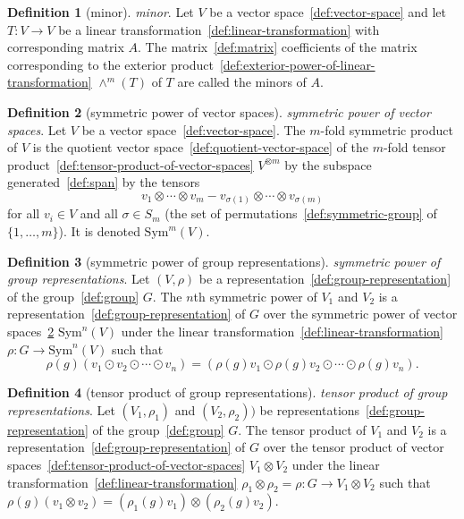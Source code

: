 \documentclass[12pt,a4paper]{article}
\theoremstyle{definition}
\newtheorem{definition}{Definition}
\begin{document}
\begin{definition}[minor]\label{def:minor}
\emph{minor}. Let $V$ be a vector space~\ref{def:vector-space} and let $T: V\to V$ be a linear transformation~\ref{def:linear-transformation} with corresponding matrix $A$. The matrix~\ref{def:matrix} coefficients of the matrix corresponding to the exterior product~\ref{def:exterior-power-of-linear-transformation} $\wedge^m(T)$ of $T$ are called the minors of $A$.
\end{definition}

\begin{definition}[symmetric power of vector spaces]\label{def:symmetric-power-of-vector-spaces}
\emph{symmetric power of vector spaces}. Let $V$ be a vector space~\ref{def:vector-space}. The $m$-fold symmetric product of $V$ is the quotient vector space~\ref{def:quotient-vector-space} of the $m$-fold tensor product~\ref{def:tensor-product-of-vector-spaces} $V^{\otimes m}$ by the subspace generated~\ref{def:span} by the tensors $$v_1\otimes\cdots\otimes v_m - v_{\sigma(1)}\otimes \cdots\otimes v_{\sigma(m)}$$ for all $v_i \in V$ and all $\sigma \in S_m$ (the set of permutations~\ref{def:symmetric-group} of $\{1,\dots,m\}$). It is denoted $\text{Sym}^m(V)$.
\end{definition}

\begin{definition}[symmetric power of group representations]\label{def:symmetric-power-of-group-representations}
\emph{symmetric power of group representations}. Let $(V,\rho)$ be a representation~\ref{def:group-representation} of the group~\ref{def:group} $G$. The $n$th symmetric power of $V_1$ and $V_2$ is a representation~\ref{def:group-representation} of $G$ over the symmetric power of vector spaces~\ref{def:symmetric-power-of-vector-spaces} $\text{Sym}^n(V)$ under the linear transformation~\ref{def:linear-transformation} $\rho:G\to \text{Sym}^n(V)$ such that $$\rho(g)(v_1\odot v_2\odot \cdots \odot v_n) = (\rho(g)v_1\odot \rho(g)v_2\odot\cdots\odot\rho(g)v_n).$$
\end{definition}

\begin{definition}[tensor product of group representations]\label{def:tensor-product-of-group-representations}
\emph{tensor product of group representations}. Let $(V_1,\rho_1)$ and $(V_2,\rho_2))$ be representations~\ref{def:group-representation} of the group~\ref{def:group} $G$. The tensor product of $V_1$ and $V_2$ is a representation~\ref{def:group-representation} of $G$ over the tensor product of vector spaces~\ref{def:tensor-product-of-vector-spaces} $V_1\otimes V_2$ under the linear transformation~\ref{def:linear-transformation} $\rho_1\otimes \rho_2 = \rho:G\to V_1\otimes V_2$ such that $\rho(g)(v_1\otimes v_2) = (\rho_1(g)v_1)\otimes (\rho_2(g)v_2)$.
\end{definition}
\end{document}
